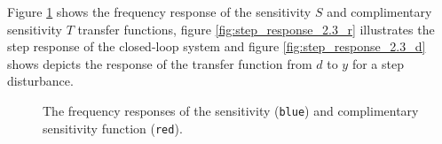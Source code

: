 Figure \ref{fig:bode_2.3} shows the frequency response of the sensitivity $S$
and complimentary sensitivity $T$ transfer functions,
figure \ref{fig:step_response_2.3_r} illustrates the step response of the
closed-loop system and figure \ref{fig:step_response_2.3_d} shows depicts the
response of the transfer function from $d$ to $y$ for a step disturbance.

\begin{figure}[H]\centering
  \scalebox{0.8}{}
  \caption{The frequency responses of the sensitivity (\texttt{blue}) and
  complimentary sensitivity function (\texttt{red}).}
  \label{fig:bode_2.3}
\end{figure}

\noindent{}
